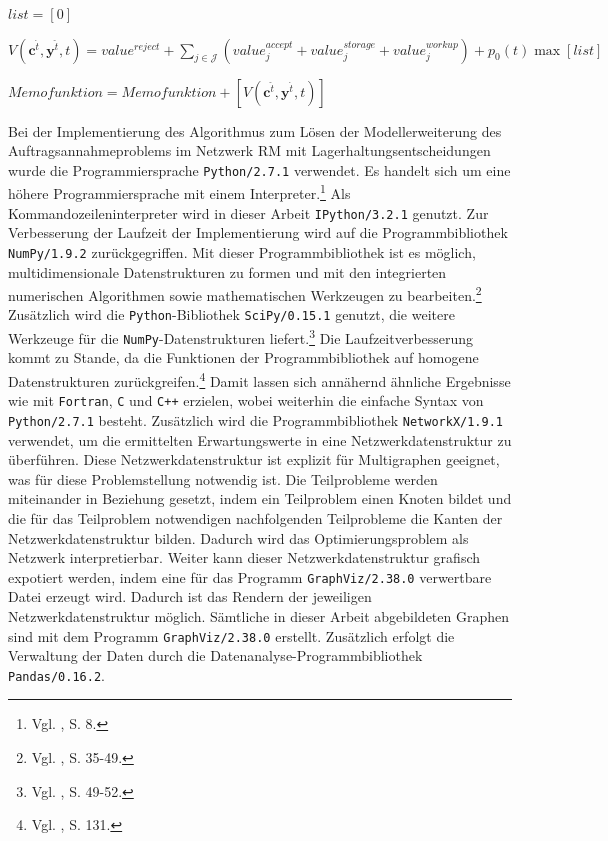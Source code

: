 \begin{algorithm}[H]
{{{			}
			$list = [0]$\\
			
		$V(\textbf{c}^{\hat t},\textbf{y}^{\hat t},t)=value^{reject} + \sum_{j\in\mathcal{J}}(value_j^{accept}+value_j^{storage}+value_j^{workup})+p_0(t)\max [list]$}
	$Memofunktion = Memofunktion+[V(\textbf{c}^{\hat t},\textbf{y}^{\hat t},t)]$}
\end{algorithm}

Bei der Implementierung des Algorithmus zum Lösen der Modellerweiterung des Auftragsannahmeproblems im Netzwerk RM mit Lagerhaltungsentscheidungen wurde die Programmiersprache \texttt{Python/2.7.1} verwendet. Es handelt sich um eine höhere Programmiersprache mit einem Interpreter.\footnote{Vgl. \cite{:2005aa}, S. 8.} Als  Kommandozeileninterpreter wird in dieser Arbeit \texttt{IPython/3.2.1} genutzt. Zur Verbesserung der Laufzeit der Implementierung wird auf die Programmbibliothek \texttt{NumPy/}\texttt{1.9.2} zurückgegriffen. Mit dieser Programmbibliothek ist es möglich, multidimensionale Datenstrukturen zu formen und mit den integrierten numerischen Algorithmen sowie mathematischen Werkzeugen zu bearbeiten.\footnote{Vgl. \cite{lindblad2013numpy}, S. 35-49.} Zusätzlich wird die \texttt{Python}-Bibliothek \texttt{SciPy/0.15.1} genutzt, die weitere Werkzeuge für die \texttt{NumPy}-Datenstrukturen liefert.\footnote{Vgl. \cite{lindblad2013numpy}, S. 49-52.} Die Laufzeitverbesserung kommt zu Stande, da die Funktionen der Programmbibliothek auf homogene Datenstrukturen zurückgreifen.\footnote{Vgl. \cite{:2006aa}, S. 131.} Damit lassen sich annähernd ähnliche Ergebnisse wie mit \texttt{Fortran}, \texttt{C} und \texttt{C++} erzielen, wobei weiterhin die einfache Syntax von \texttt{Python/2.7.1} besteht. Zusätzlich wird die Programmbibliothek \texttt{NetworkX/1.9.1} verwendet, um die ermittelten Erwartungswerte in eine Netzwerkdatenstruktur zu überführen. Diese Netzwerkdatenstruktur ist explizit für Multigraphen geeignet, was für diese Problemstellung notwendig ist. Die Teilprobleme werden miteinander in Beziehung gesetzt, indem ein Teilproblem einen Knoten bildet und die für das Teilproblem notwendigen nachfolgenden Teilprobleme die Kanten der Netzwerkdatenstruktur bilden. Dadurch wird das Optimierungsproblem als Netzwerk interpretierbar. Weiter kann dieser Netzwerkdatenstruktur grafisch expotiert werden, indem eine für das Programm \texttt{GraphViz/2.38.0} verwertbare Datei erzeugt wird. Dadurch ist das Rendern der jeweiligen Netzwerkdatenstruktur möglich. Sämtliche in dieser Arbeit abgebildeten Graphen sind mit dem Programm \texttt{GraphViz/2.38.0} erstellt. Zusätzlich erfolgt die Verwaltung der Daten durch die Datenanalyse-Programmbibliothek \texttt{Pandas/0.16.2}.

